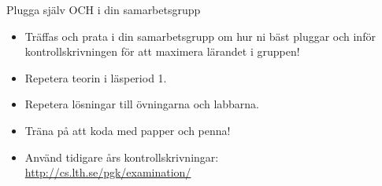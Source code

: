 \begin{Slide}{Plugga själv OCH i din samarbetsgrupp}
\begin{itemize}\SlideFontSmall
  \item Träffas och prata i din samarbetsgrupp om hur ni bäst pluggar  och  inför kontrollskrivningen för att maximera lärandet i gruppen!

  \item Repetera teorin i läsperiod 1.
  
  \item Repetera lösningar till övningarna och labbarna.

  \item Träna på att koda med papper och penna!

  \item Använd tidigare års kontrollskrivningar: \\ \url{http://cs.lth.se/pgk/examination/}



\end{itemize}
\end{Slide}




